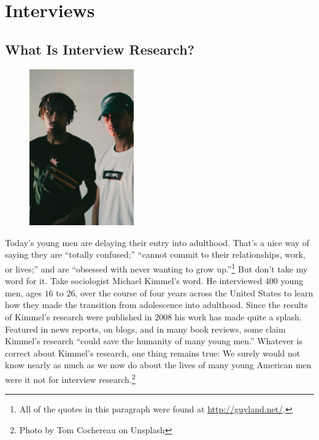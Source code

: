\chapter{Interviews}\label{ch09:interviews}

\section{What Is Interview Research?}

\begin{figure}
	\centering
	\includegraphics[width=0.4\textwidth]{gfx/09-men} 
\end{figure}

Today's young men are delaying their entry into adulthood. That's a nice way of saying they are ``totally confused;'' ``cannot commit to their relationships, work, or lives;'' and are ``obsessed with never wanting to grow up.''\footnote{All of the quotes in this paragraph were found at \url{http://guyland.net/}.} But don't take my word for it. Take sociologist Michael Kimmel's word. He interviewed $ 400 $ young men, ages $ 16 $ to $ 26 $, over the course of four years across the United States to learn how they made the transition from adolescence into adulthood. Since the results of Kimmel's research were published in $ 2008 $\cite{kimmel2008perilous} his work has made quite a splash. Featured in news reports, on blogs, and in many book reviews, some claim Kimmel's research ``could save the humanity of many young men.'' Whatever is correct about Kimmel's research, one thing remains true: We surely would not know nearly as much as we now do about the lives of many young American men were it not for interview research.\footnote{Photo by Tom Cochereau on Unsplash}

